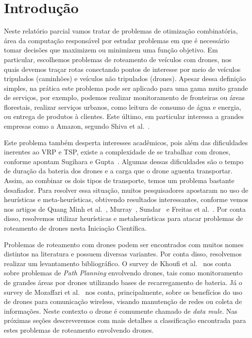 \documentclass[12pt, a4paper]{article}
\begin{document}
\section{Introdução} \label{sec:introduction}
Neste relatório parcial vamos tratar de problemas de otimização combinatória, área da computação responsável por estudar problemas em que é necessário tomar decisões que maximizem ou minimizem uma função objetivo. Em particular, escolhemos problemas de roteamento de veículos com drones, nos quais devemos traçar rotas conectando pontos de interesse por meio de veículos tripulados (caminhões) e veículos não tripulados (drones). Apesar dessa definição simples, na prática este problema pode ser aplicado para uma gama muito grande de serviços, por exemplo, podemos realizar monitoramento de fronteiras ou áreas florestais, realizar serviços urbanos, como leitura de consumo de água e energia, ou entrega de produtos à clientes. Este último, em particular interessa a grandes empresas como a Amazon, segundo Shiva et al.~\cite{singireddy2018technology}.\par
Este problema também desperta interesses acadêmicos, pois além  das dificuldades inerentes ao VRP e TSP, existe a complexidade de se trabalhar com drones, conforme apontam Sugihara e Gupta~\cite{sugihara2011path}. Algumas dessas dificuldades são o tempo de duração da bateria dos drones e a carga que o drone aguenta transportar. Assim, ao combinar os dois tipos de transporte, temos um problema bastante desafiador. Para resolver essa situação, muitos pesquisadores apostaram no uso de heurísticas e meta-heurísticas, obtivendo resultados interessantes, conforme vemos nos artigos de Quang Minh et al.~\cite{ha2018min}, Murray~\cite{murray2015flying}, Sundar~\cite{sundar2013algorithms} e Freitas et al.~\cite{de2020variable}. Por conta disso, resolvemos utilizar heurísticas e metaheurísticas para atacar problemas de roteamento de drones nesta Iniciação Científica.\par
Problemas de roteamento com drones podem ser encontrados com muitos nomes distintos na literatura e possuem diversas variantes. Por conta disso, resolvemos realizar um levantamento bibliográfico. O survey de Khoufi et al.~\cite{khoufi2019survey} nos conta sobre problemas de \textit{Path Planning} envolvendo drones, tais como monitoramento de grandes áreas por drones utilizando bases de recarregamento de bateria. Já o survey de Mozaffari et al.~\cite{mozaffari2019tutorial} nos conta, principalmente, sobre os benefícios do uso de drones para comunicação wireless, visando manutenção de redes ou coleta de informações. Neste contexto o drone é comumente chamado de \textit{data mule}. Nas próximas seções descreveremos com mais detalhes a classificação encontrada para estes problemas de roteamento envolvendo drones. \par
\end{document}
